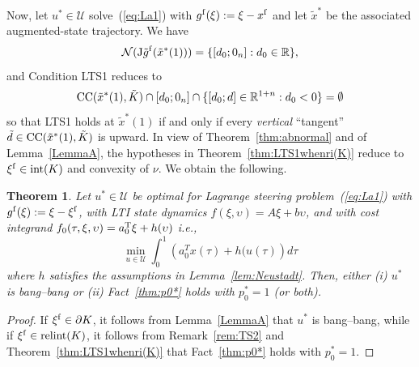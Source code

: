 \documentclass[letterpaper,10pt,conference]{ieeeconf}
\def\R{{\mathbb{R}}}
\newtheorem{theorem}{Theorem} %
\begin{document}
Now, let $u^*\in\mathcal U$ solve~(\ref{eq:La1})
with $g^{\rm f}(\xi):=\xi-x^{\rm f}$ 
and let $\tilde x^*$ be the associated augmented-state trajectory.
We have
\[
{\mathcal N}({\rm J}\tilde g^{\rm f}(\tilde x^*(1)))= \{[d_0;0_n]:d_0\in\R\},
\]
and Condition LTS1 reduces to
\[
{\rm CC}(\tilde x^*(1),\tilde K)
\cap[d_0;0_n] %
\cap\{[d_0;d]\in\R^{1+n}:d_0<0\}
=\emptyset
\]
so that LTS1 holds at $\tilde x^*(1)$ if and only if every {\em vertical} 
``tangent'' $\tilde d\in{\rm CC}(\tilde x^*(1),\tilde K)$ is upward.
In view of Theorem~\ref{thm:abnormal} and of 
Lemma~\ref{LemmaA},
the hypotheses in 
Theorem~\ref{thm:LTS1whenri(K)} reduce to $\xi^{\rm f}\in{\rm int}(K)$ and
convexity of $\nu$.
We obtain the following.
\begin{theorem}
\label{col:xfin K(T_0)}
Let $u^*\in\mathcal U$ be optimal for Lagrange steering
problem~(\ref{eq:La1}) with $g^{\rm f}(\xi):=\xi-\xi^{\rm f}$,
with LTI state dynamics $f(\xi,\upsilon)=A\xi+b\upsilon$, 
and with cost integrand 
$f_0(\tau,\xi,\upsilon)=a_0^{\rm T}\xi + h(\upsilon)$
i.e.,
\[
\min_{u\in\mathcal{U}}\int_0^1\left(a_0^T x(\tau)+h(u(\tau)\right)d\tau
\]
where $h$ satisfies the assumptions
in Lemma~\ref{lem:Neustadt}.
Then, either (i) $u^*$ is bang--bang or (ii)
Fact~\ref{thm:p0*} holds with $p_0^*=1$ (or both). 
\end{theorem}
\begin{proof}
If $\xi^{\rm f}\in\partial K$, it follows from Lemma~\ref{LemmaA} that $u^*$ is
bang--bang, while if $\xi^{\rm f}\in{\rm relint}(K)$, it follows from 
Remark~\ref{rem:TS2} and Theorem~\ref{thm:LTS1whenri(K)} that 
Fact~\ref{thm:p0*} holds with $p_0^*=1$.
\end{proof}
\end{document}
